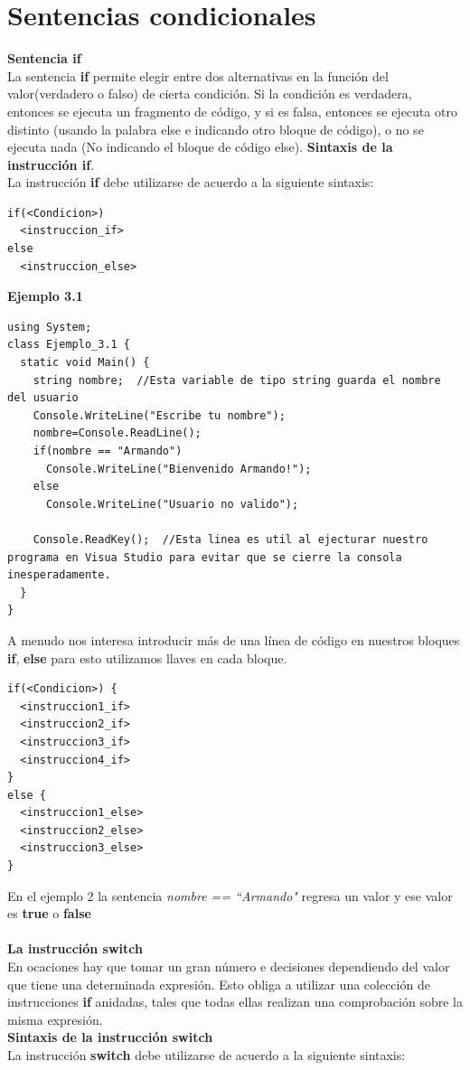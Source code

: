 \documentclass[12pt,a4paper]{report}
\begin{document}
\section{Sentencias condicionales}
\textbf{Sentencia if}\\La sentencia \textbf{if} permite elegir entre dos alternativas en la función del valor(verdadero o falso) de cierta condición. Si la condición es verdadera, entonces se ejecuta un fragmento de código, y si es falsa, entonces se ejecuta otro distinto (usando la palabra else e indicando otro bloque de código), o no se ejecuta nada (No indicando el bloque de código else).
\textbf{Sintaxis de la instrucción if}.\\La instrucción \textbf{if} debe utilizarse de acuerdo a la siguiente sintaxis:
\begin{lstlisting}
if(<Condicion>)
  <instruccion_if>
else
  <instruccion_else>
\end{lstlisting}
\textbf{Ejemplo 3.1}\\
\begin{lstlisting}
using System;
class Ejemplo_3.1 {
  static void Main() {
    string nombre;  //Esta variable de tipo string guarda el nombre del usuario
    Console.WriteLine("Escribe tu nombre");
    nombre=Console.ReadLine();
    if(nombre == "Armando")
      Console.WriteLine("Bienvenido Armando!");
    else
      Console.WriteLine("Usuario no valido");   

    Console.ReadKey();  //Esta linea es util al ejecturar nuestro programa en Visua Studio para evitar que se cierre la consola inesperadamente.
  }
}
\end{lstlisting}
A menudo nos interesa introducir más de una línea de código en nuestros bloques \textbf{if}, \textbf{else} para esto utilizamos llaves {} en cada bloque.\\
\begin{lstlisting}
if(<Condicion>) {
  <instruccion1_if>
  <instruccion2_if>
  <instruccion3_if>
  <instruccion4_if>
}
else {
  <instruccion1_else>
  <instruccion2_else>
  <instruccion3_else>
}
\end{lstlisting}
En el ejemplo 2 la sentencia \textit{nombre == ``Armando"} regresa un valor y ese valor es \textbf{true} o \textbf{false}\\\\\textbf{La instrucción switch}\\
En ocaciones hay que tomar un gran número e decisiones dependiendo del valor que tiene una determinada expresión. Esto obliga a utilizar una colección de instrucciones \textbf{if} anidadas, tales que todas ellas realizan una comprobación sobre la misma expresión.\\\textbf{Sintaxis de la instrucción switch}\\La instrucción \textbf{switch} debe utilizarse de acuerdo a la siguiente sintaxis:\\
\end{document}
